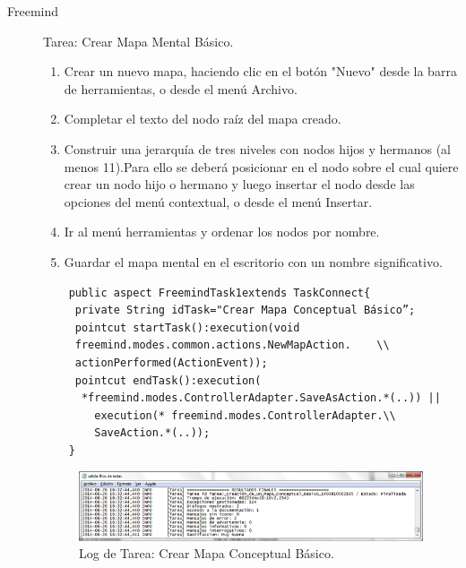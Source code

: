 \begin{description}

\item[Freemind]
Tarea: Crear Mapa Mental Básico.

	\begin{enumerate}
		\item Crear un nuevo mapa, haciendo clic en el botón "Nuevo" desde la barra de herramientas, o desde el menú Archivo. 
		\item Completar el texto del nodo raíz del mapa creado.
		\item Construir una jerarquía de tres niveles con nodos hijos y hermanos (al menos 11).Para ello se deberá posicionar en el nodo sobre el cual quiere crear un nodo hijo o hermano y luego insertar el nodo desde las opciones del menú contextual, o desde el menú Insertar.
		\item Ir al menú herramientas y ordenar los nodos por nombre.
		\item Guardar el mapa mental en el escritorio con un nombre significativo.
	\end{enumerate}
	
	
	\begin{verbatim}
	public aspect FreemindTask1extends TaskConnect{
	 private String idTask="Crear Mapa Conceptual Básico”;
	 pointcut startTask():execution(void  
	 freemind.modes.common.actions.NewMapAction.	\\
	 actionPerformed(ActionEvent));
	 pointcut endTask():execution( 	 
	  *freemind.modes.ControllerAdapter.SaveAsAction.*(..)) ||
	    execution(* freemind.modes.ControllerAdapter.\\
	    SaveAction.*(..));
	}
	\end{verbatim}

	\begin{figure}[ht!]
		\centering
		\includegraphics[scale=1]{figs/fig4.png}
		\caption{\label{fig:fig4} Log de Tarea: Crear Mapa Conceptual Básico.}
	\end{figure}


\end{description}
